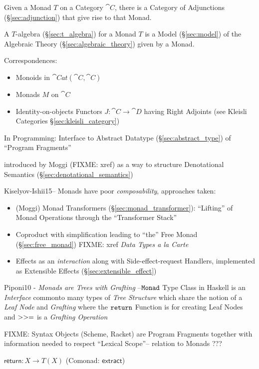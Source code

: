 Given a Monad $T$ on a Category $\cat{C}$, there is a Category of
Adjunctions (\S\ref{sec:adjunction}) that give rise to that Monad.

A $T$-algebra (\S\ref{sec:t_algebra}) for a Monad $T$ is a Model
(\S\ref{sec:model}) of the Algebraic Theory
(\S\ref{sec:algebraic_theory}) given by a Monad.

Correspondences: \cite{jacobs-heunen-hasuo09}
\begin{itemize}
\item Monoids in $\cat{Cat}(\cat{C},\cat{C})$
\item Monads $M$ on $\cat{C}$
\item Identity-on-objects Functors $J : \cat{C} \rightarrow \cat{D}$
  having Right Adjoints (see Kleisli Categories
  \S\ref{sec:kleisli_category})
\end{itemize}

In Programming: Interface to Abstract Datatype
(\S\ref{sec:abstract_type}) of ``Program Fragments''

introduced by Moggi (FIXME: xref) as a way to structure Denotational Semantics
(\S\ref{sec:denotational_semantics})

Kiselyov-Ishii15-- Monads have poor \emph{composability}, approaches taken:
\begin{itemize}
  \item (Moggi) Monad Transformers (\S\ref{sec:monad_transformer}): ``Lifting''
    of Monad Operations through the ``Transformer Stack''
  \item Coproduct with simplification leading to ``the'' Free Monad
    (\S\ref{sec:free_monad}) FIXME: xref \emph{Data Types a la Carte}
  \item Effects as an \emph{interaction} along with Side-effect-request
    Handlers, implemented as Extensible Effects (\S\ref{sec:extensible_effect})
\end{itemize}

Piponi10 - \emph{Monads are Trees with Grafting}
--$\mathtt{Monad}$ Type Class in Haskell is an \emph{Interface} commonto many
types of \emph{Tree Structure} which share the notion of a \emph{Leaf Node} and
\emph{Grafting} where the $\mathtt{return}$ Function is for creating Leaf Nodes
and $\mathtt{>>=}$ is a \emph{Grafting Operation}

FIXME: Syntax Objects (Scheme, Racket) are Program Fragments together
with information needed to respect ``Lexical Scope''-- relation to
Monads ???

$\mathsf{return} : X \rightarrow T(X)$ (Comonad: $\textsf{extract}$)

